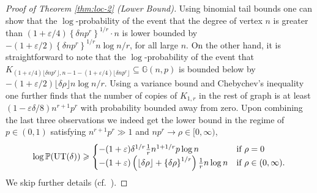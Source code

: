 \documentclass[a4paper,11pt,english,reqno]{amsart}
\numberwithin{equation}{section}
\renewcommand{\geq}{\geqslant}
\newcommand{\UT}{\textup{UT}(\delta)}
\renewcommand{\P}{\mathbb{P}}
\newcommand{\G}{\mathbb{G}}
\begin{document}
			\begin{proof}[Proof of Theorem \ref{thm:loc-2} (Lower Bound)]
				Using binomial tail bounds one can show that the $\log$-probability of the event that the degree of vertex $n$ is greater than $(1+\varepsilon/4)\left\{\delta np^{r}\right\}^{1/r}\cdot n$ is lower bounded by $-(1+\varepsilon/2) \left\{\delta np^{r}\right\}^{1/r}n \log n/r$, for all large $n$. On the other hand, it is straightforward to note that the $\log$-probability of the event that $K_{(1+\varepsilon/4)\lfloor \delta np^r \rfloor, n-1- (1+\varepsilon/4)\lfloor \delta np^r \rfloor} \subseteq \G(n,p)$ is bounded below by $-(1+\varepsilon/2) \lfloor \delta \rho \rfloor n \log n/r$. Using a variance bound and Chebychev's inequality one further finds that the number of copies of $K_{1,r}$ in the rest of graph is at least $(1-\varepsilon\delta/8) n^{r+1}p^r$ with probability bounded away from zero. Upon combining the last three observations we indeed get the lower bound in the regime of $p\in (0,1)$ satisfying $n^{r+1}p^{r}\gg1$ and $np^{r}\rightarrow \rho\in [0,\infty)$,
				\begin{equation}
					\label{s2:Lower bound star}
					\log \P(\UT)\geq \begin{cases}-(1+\varepsilon)\delta^{1/r}\frac{1}{r}n^{1+1/r}p\log n\quad &\text{if $\rho=0$}\\
						-(1+\varepsilon)\left(\left\lfloor\delta \rho\right\rfloor +\left\{\delta \rho\right\}^{1/r}\right)\frac{1}{r} n\log n &\text{if $\rho\in (0,\infty)$}.
					\end{cases}
				\end{equation}
				We skip further details (cf.~\cite[Section 5]{AS25}).
			\end{proof}
\end{document}

